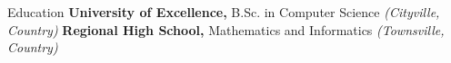 \begin{rubric}{Education}
\entry*[2020 -- 2024]%
    \textbf{University of Excellence,} B.Sc. in Computer Science \emph{(Cityville, Country)}
%
\entry*[2016 -- 2020]%
    \textbf{Regional High School,} Mathematics and Informatics \emph{(Townsville, Country)}
\end{rubric}